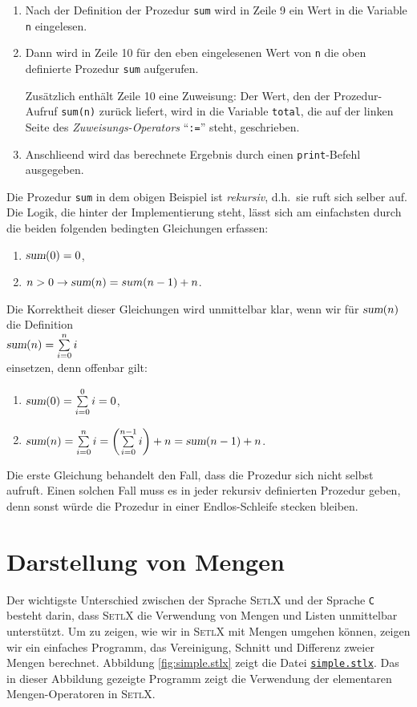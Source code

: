 \begin{enumerate}
\item Nach der Definition der Prozedur \texttt{sum}  wird in Zeile 9 ein Wert 
      in die Variable \texttt{n} eingelesen.
\item Dann wird in Zeile 10 f\"{u}r den eben eingelesenen Wert von \texttt{n} die oben definierte Prozedur
      \texttt{sum} aufgerufen.  

      Zus\"{a}tzlich enth\"{a}lt Zeile 10 eine Zuweisung: Der Wert, den der Prozedur-Aufruf
      \texttt{sum(n)} zur\"{u}ck liefert, wird in die Variable \texttt{total}, die auf der
      linken Seite des \emph{Zuweisungs-Operators} ``\texttt{:=}'' steht, geschrieben.
\item Anschlie\3end wird das berechnete Ergebnis durch einen \texttt{print}-Befehl ausgegeben.
\end{enumerate}
Die Prozedur \texttt{sum} in dem obigen Beispiel ist \emph{rekursiv}, d.h.~sie ruft sich
selber auf.  Die Logik, die hinter der Implementierung steht, l\"{a}sst sich am einfachsten
durch die beiden folgenden bedingten Gleichungen erfassen:
\begin{enumerate}
\item $\textsl{sum}(0) = 0$,
\item $n > 0 \rightarrow \textsl{sum}(n) = sum(n-1) + n$.
\end{enumerate}
Die Korrektheit dieser Gleichungen wird unmittelbar klar, wenn wir f\"{u}r $\textsl{sum}(n)$
die Definition
\\[0.2cm]
\hspace*{1.3cm}
$\textsl{sum}(n)= \sum\limits_{i=0}^n i$ 
\\[0.2cm]
einsetzen, denn offenbar gilt:
\begin{enumerate}
\item $\textsl{sum}(0)= \sum\limits_{i=0}^0 i = 0$,
\item $\textsl{sum}(n)= \sum\limits_{i=0}^n i = \left(\sum\limits_{i=0}^{n-1} i\right) + n = \textsl{sum}(n-1) + n$. 

\end{enumerate}
Die erste Gleichung behandelt den Fall, dass die Prozedur sich nicht selbst
aufruft.  Einen solchen Fall muss es in jeder rekursiv definierten Prozedur geben, denn
sonst w\"{u}rde die Prozedur in einer Endlos-Schleife stecken bleiben. 

\section{Darstellung von Mengen}
Der wichtigste Unterschied zwischen der Sprache \textsc{SetlX} und der Sprache \texttt{C}
besteht darin, dass \textsc{SetlX} die Verwendung von Mengen und Listen unmittelbar unterst\"{u}tzt.
Um zu zeigen, wie wir in \textsc{SetlX} mit Mengen umgehen k\"{o}nnen, zeigen wir ein
 einfaches Programm, das Vereinigung, Schnitt und
Differenz zweier Mengen berechnet.   Abbildung \ref{fig:simple.stlx} zeigt die Datei
\href{https://github.com/karlstroetmann/Logik/blob/master/SetlX/simple.stlx}{\texttt{simple.stlx}}.  
Das in dieser Abbildung gezeigte Programm zeigt die Verwendung der
elementaren Mengen-Operatoren in \textsc{SetlX}.

